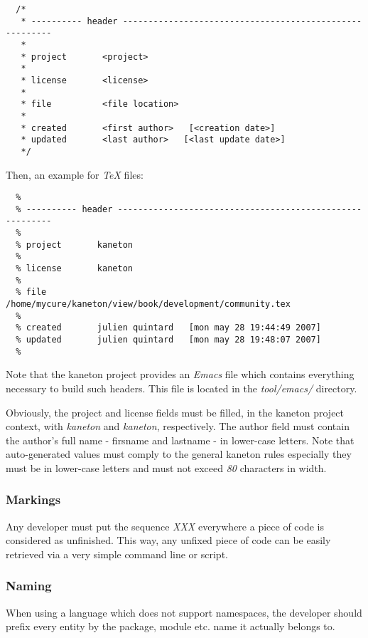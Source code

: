 \begin{verbatim}
  /*
   * ---------- header --------------------------------------------------------
   *
   * project       <project>
   *
   * license       <license>
   *
   * file          <file location>
   *
   * created       <first author>   [<creation date>]
   * updated       <last author>   [<last update date>]
   */
\end{verbatim}

Then, an example for \textit{TeX} files:

\begin{verbatim}
  %
  % ---------- header ---------------------------------------------------------
  %
  % project       kaneton
  %
  % license       kaneton
  %
  % file          /home/mycure/kaneton/view/book/development/community.tex
  %
  % created       julien quintard   [mon may 28 19:44:49 2007]
  % updated       julien quintard   [mon may 28 19:48:07 2007]
  %
\end{verbatim}

Note that the kaneton project provides an \textit{Emacs} file which contains
everything necessary to build such headers. This file is located in the
\textit{tool/emacs/} directory.

Obviously, the project and license fields must be filled, in the kaneton
project context, with \textit{kaneton} and \textit{kaneton}, respectively. The
author field must contain the author's full name - firsname and lastname -
in lower-case letters. Note that auto-generated values must comply to
the general kaneton rules especially they must be in lower-case letters and
must not exceed \textit{80} characters in width.


\subsubsection{Markings}

Any developer must put the sequence \textit{XXX} everywhere a piece of code
is considered as unfinished. This way, any unfixed piece of code can be
easily retrieved via a very simple command line or script.


\subsubsection{Naming}

When using a language which does not support namespaces, the developer should
prefix every entity by the package, module etc. name it actually belongs to.

